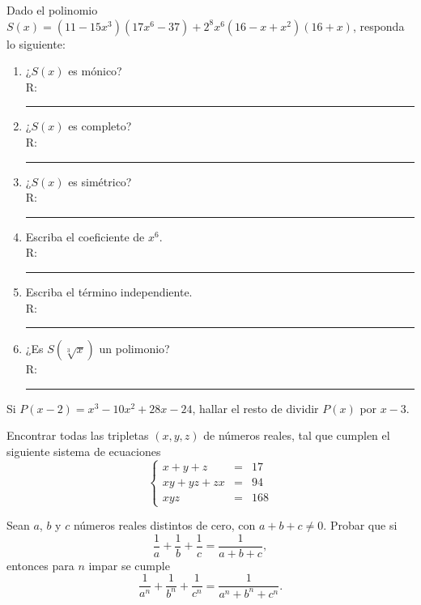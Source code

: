 \begin{section-problem}
    Dado el polinomio $S(x) = (11 - 15x^3)(17x^6 - 37) + 2^8 x^6 (16 - x + x^2)(16 + x)$, responda lo siguiente:
    \begin{multicols}{2}
        \begin{enumerate}
            \item ¿$S(x)$ es mónico? \\R: \rule{1cm}{0.1mm}
            \item ¿$S(x)$ es completo? \\R: \rule{1cm}{0.1mm}
            \item ¿$S(x)$ es simétrico? \\R: \rule{1cm}{0.1mm}
            \item Escriba el coeficiente de $x^6$. \\R: \rule{1cm}{0.1mm}
            \item Escriba el término independiente.\\ R: \rule{1cm}{0.1mm}
            \item ¿Es $S\left(\sqrt[3]{x}\right)$ un polimonio? \\ R: \rule{2cm}{0.1mm}
        \end{enumerate}
    \end{multicols}
\end{section-problem}

\begin{section-problem}
    Si $P(x - 2) = x^3 - 10x^2 + 28x - 24$, hallar el resto de dividir $P(x)$ por $x - 3$.
\end{section-problem}

\begin{section-problem}
    Encontrar todas las tripletas $(x, y, z)$ de números reales, tal que cumplen el siguiente sistema de ecuaciones
    \[
        \left\{
        \begin{array}{rcl}
            x + y + z & =& 17\\
            xy + yz + zx & =& 94\\
            x y z & =& 168
        \end{array}
        \right.
    \]
\end{section-problem}

\begin{section-problem}
    Sean $a$, $b$ y $c$ números reales distintos de cero, con $a + b + c \neq 0$.
    Probar que si
    \[\frac{1}{a} + \frac{1}{b} + \frac{1}{c} = \frac{1}{a + b + c},\]
    entonces para $n$ impar se cumple
    \[\frac{1}{a^n} + \frac{1}{b^n} + \frac{1}{c^n} = \frac{1}{a^n + b^n + c^n}.\]
\end{section-problem}

